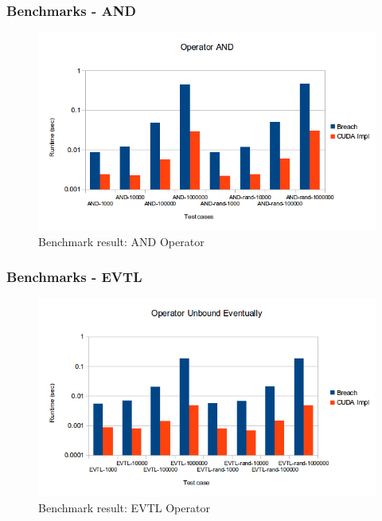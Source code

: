 \documentclass{beamer}
\begin{document}
\begin{frame}
\frametitle{Benchmarks - AND}
\begin{figure}[H]
    \includegraphics[scale=0.5]{bm_and.png}
    \caption{
        \label{fig:bm_and}
        Benchmark result: AND Operator}
\end{figure}
\end{frame}

\begin{frame}
\frametitle{Benchmarks - EVTL}
\begin{figure}[H]
    \includegraphics[scale=0.5]{bm_evtl.png}
    \caption{
        \label{fig:bm_evtl}
        Benchmark result: EVTL Operator}
\end{figure}
\end{frame}
\end{document}
